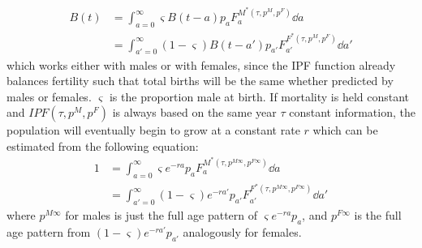 \begin{align}
B(t) &= \int_{a=0}^\infty \varsigma B(t-a)p_aF_a^{M^\ast(\tau,p^M, p^F)}\dd a
\\ &= \int_{a'=0}^\infty (1-\varsigma) B(t-a')p_{a'}F_{a'}^{F^\ast(\tau,p^M,
p^F)}\dd a'
\end{align}
which works either with males or with females, since the IPF function already
balances fertility such that total births will be the same whether predicted by
males or females. $\varsigma$ is the proportion male at birth. If mortality is
held constant and $IPF(\tau,p^M, p^F)$ is always based on the same year $\tau$ 
constant information, the population will eventually begin
to grow at a constant rate $r$ which can be estimated from the following
equation:
\begin{align}
\label{eq:IPFtricky}
1 &= \int_{a=0}^\infty \varsigma e^{-ra}p_aF_a^{M^\ast(\tau,p^{M\infty},
p^{F\infty})}\dd a \\ 
&= \int_{a'=0}^\infty (1-\varsigma) e^{-ra'}p_{a'}F_{a'}^{F^\ast(\tau,p^{M\infty},
p^{F\infty})}\dd a'
\end{align}
where $p^{M\infty}$ for males is just the full age pattern of
$\varsigma e^{-ra}p_a$, and $p^{F\infty}$ is the full age pattern
from $(1-\varsigma) e^{-ra'}p_{a'}$ analogously for females. 

